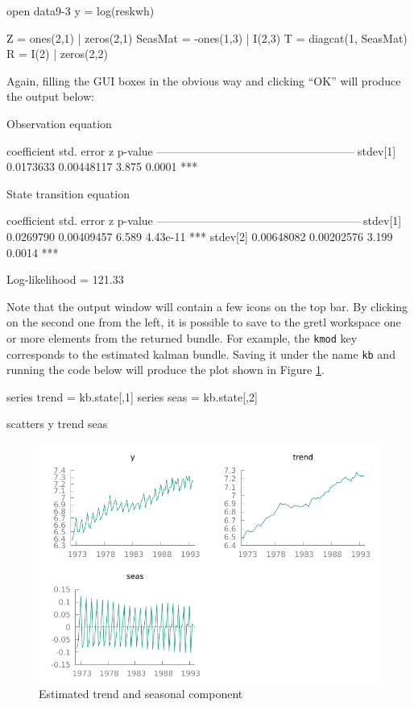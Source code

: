 \begin{code}
open data9-3
y = log(reskwh)

Z = ones(2,1) | zeros(2,1)
SeasMat = -ones(1,3) | I(2,3)
T = diagcat(1, SeasMat)
R = I(2) | zeros(2,2)
\end{code}

Again, filling the GUI boxes in the obvious way and clicking ``OK''
will produce the output below:

\begin{code}

Observation equation

             coefficient   std. error     z     p-value
  -----------------------------------------------------
  stdev[1]    0.0173633    0.00448117   3.875   0.0001  ***


State transition equation

             coefficient   std. error     z     p-value
  ------------------------------------------------------
  stdev[1]   0.0269790     0.00409457   6.589   4.43e-11 ***
  stdev[2]   0.00648082    0.00202576   3.199   0.0014   ***

  Log-likelihood = 121.33
\end{code}

Note that the output window will contain a few icons on the top
bar. By clicking on the second one from the left, it is possible to
save to the gretl workspace one or more elements from the returned
bundle. For example, the \texttt{kmod} key corresponds to the
estimated kalman bundle. Saving it under the name \texttt{kb} and
running the code below will produce the plot shown in Figure
\ref{fig:rw+seas}.

\begin{code}
series trend = kb.state[,1]
series seas  = kb.state[,2]

scatters y trend seas
\end{code}


\begin{figure}[htb]
  \centering
  \includegraphics[scale=1.0]{figures/rw+seas}
  \caption{Estimated trend and seasonal component}\label{fig:rw+seas}
\end{figure}

\let\steta\relax
\let\strR\relax


